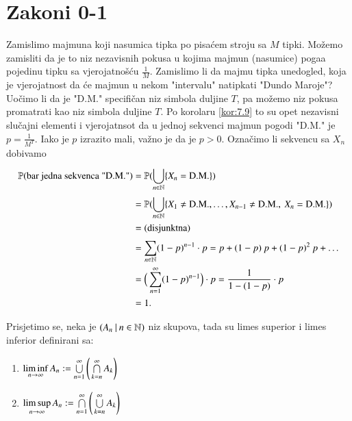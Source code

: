 
\chapter{Zakoni 0-1}  \label{zakoni_01}

\begin{pr}  \label{pr:9.1}
    Zamislimo majmuna koji nasumica tipka po pisa\' cem stroju sa $M$ tipki.
    Mo\v zemo zamisliti da je to niz nezavisnih pokusa u kojima majmun (nasumice) poga\dj a pojedinu tipku sa vjerojatno\v s\' cu $\frac{1}{M}$.
    Zamislimo li da majmu tipka unedogled, koja je vjerojatnost da \' ce majmun u nekom "intervalu" natipkati "Dundo Maroje"?
    Uo\v cimo li da je "D.M." specifi\v can niz simbola duljine $T$, pa mo\v zemo niz pokusa promatrati kao niz simbola duljine $T$.
    Po korolaru \ref{kor:7.9} to su opet nezavisni slu\v cajni elementi i vjerojatnsot da u jednoj sekvenci majmun pogodi "D.M." je $p = \frac{1}{M^T}$.
    Iako je $p$ izrazito mali, va\v zno je da je $p > 0$.
    Ozna\v cimo li sekvencu sa $X_n$ dobivamo
    \begin{equation*}
        \begin{aligned}
            \mathbb{P}({\textnormal{bar jedna sekvenca "D.M."}})
            &= \mathbb{P}({\bigcup\limits_{n \in \mathbb{N}}^{} \{X_n = \textnormal{D.M.}\}})\\
            &= \mathbb{P}({\bigcup\limits_{n \in \mathbb{N}}^{} \{X_1 \neq \textnormal{D.M.}, \ldots, X_{n-1} \neq \textnormal{D.M.}, \: X_n = \textnormal{D.M.}\}})\\
            &= \textnormal{(disjunktna)}\\
            &= \sum\limits_{n \in \mathbb{N}}^{} (1 - p)^{n - 1} \cdot p = p + (1 - p) \: p + (1 - p)^2 \: p + \ldots\\
            &= \Big( \sum\limits_{n = 1}^{\infty} (1 - p)^{n - 1} \Big) \cdot p = \frac{1}{1 - (1 - p)} \cdot p\\
            &= 1.
        \end{aligned}
    \end{equation*}
\end{pr}

\begin{nap} \label{nap:9.1-1}
    Prisjetimo se, neka je $({A_n} \: | \: {n \in \mathbb{N}})$ niz skupova, tada su limes superior i limes inferior definirani sa:
    \begin{enumerate}[label=(\roman*)]
        \item $\liminf\limits_{n \to \infty} A_n := \bigcup\limits_{n = 1}^{\infty} \Bigg( \bigcap\limits_{k = n}^{\infty} A_k \Bigg)$
        \item $\limsup\limits_{n \to \infty} A_n := \bigcap\limits_{n = 1}^{\infty} \Bigg( \bigcup\limits_{k = n}^{\infty} A_k \Bigg)$
    \end{enumerate}
\end{nap}


